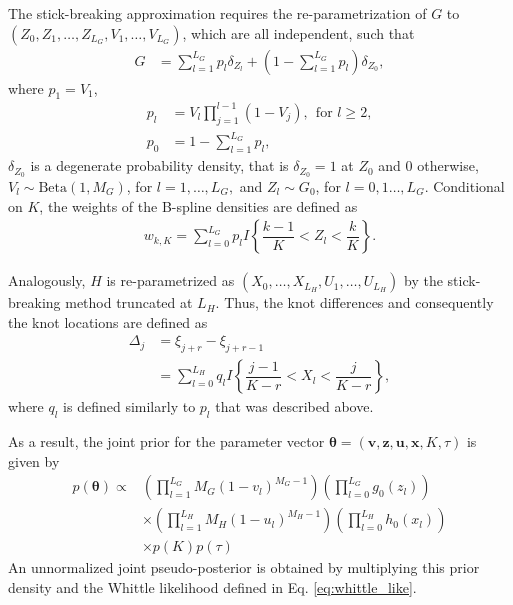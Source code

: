 \documentclass[aps,reprint,amsmath,amssymb,showpacs,showkeys]{revtex4-1}%
\begin{document}
The stick-breaking approximation requires the re-parametrization of $G$ to $(Z_0,Z_1,\dots, Z_{L_G},V_1,\dots,V_{L_G})$, which are all independent, such that
\begin{align*}
G&=\sum_{l=1}^{L_G} p_l \delta_{Z_l} + \left(1- \sum_{l=1}^{L_G} p_l\right)\delta_{ Z_{0}},
\end{align*}
where $p_1 = V_1$, 
\begin{align*}
p_l &= V_l \prod_{j=1}^{l-1} (1 - V_j), \:\: \text{for } l \geq 2, \\
p_0 &= 1-\sum_{l=1}^{L_G}p_l,
\end{align*}
$\delta_{Z_{0}}$ is a degenerate probability density, that is $\delta_{Z_0}=1$ at $Z_0$ and 0 otherwise, $V_l \sim \text{Beta}(1,M_G)$, for $l=1,\dots,L_G,$ and $Z_l \sim G_0$, for $l = 0,1\dots,L_G$.  Conditional on $K$, the weights of the B-spline densities are defined as
\begin{align*}
	w_{k,K} = \sum_{l=0}^{L_G}p_l I\left\{ \dfrac{k-1}{K} < Z_l < \dfrac{k}{K}\right\}.
\end{align*}

Analogously, $H$ is re-parametrized as $(X_0,\dots,X_{L_H}, U_1,\dots,U_{L_H})$ by the stick-breaking method truncated at $L_H$.  Thus, the knot differences and consequently the knot locations are defined as
\begin{align*}
\Delta_{j} &= \xi_{j+r} - \xi_{j+r-1} \\
&= \sum_{l=0}^{L_H}q_l I\left\{ \dfrac{j-1}{K-r} < X_l < \dfrac{j}{K-r} \right\},		
\end{align*}
where $q_l$ is defined similarly to $p_l$ that was described above.

As a result, the joint prior for the parameter vector $\bm{\theta} = (\textbf{v},\textbf{z},\textbf{u},\textbf{x},K,\tau)$ is given by
\begin{align}
p(\bm{\theta}) \propto & \left( \prod_{l=1}^{L_G} M_G(1-v_l)^{M_G -1} \right) \left( \prod_{l=0}^{L_G}g_0(z_l) \right) \nonumber \\
&\times \left( \prod_{l=1}^{L_H} M_H(1-u_l)^{M_H -1} \right) \left( \prod_{l=0}^{L_H}h_0(x_l) \right) \nonumber \\
&\times p(K) p(\tau) \label{eq:prior}
\end{align}
An unnormalized joint pseudo-posterior is obtained by multiplying this prior density and the Whittle likelihood defined in Eq. \eqref{eq:whittle_like}.
\end{document}
